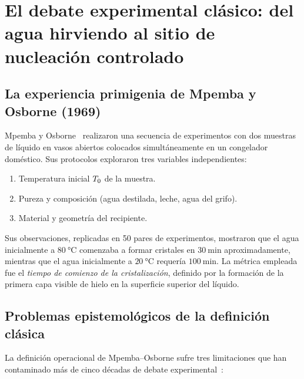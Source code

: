 \chapter{El debate experimental clásico: del agua hirviendo al sitio de nucleación controlado}
\label{ch:debate_clasico}

\section{La experiencia primigenia de Mpemba y Osborne (1969)}

Mpemba y Osborne~\cite{mpemba1969} realizaron una secuencia de experimentos con dos 
muestras de líquido en vasos abiertos colocados simultáneamente en un congelador 
doméstico. Sus protocolos exploraron tres variables independientes:
\begin{enumerate}
\item Temperatura inicial $T_{0}$ de la muestra.
\item Pureza y composición (agua destilada, leche, agua del grifo).
\item Material y geometría del recipiente.
\end{enumerate}

\noindent Sus observaciones, replicadas en \SI{50}{} pares de experimentos, mostraron 
que el agua inicialmente a $\SI{80}{\celsius}$ comenzaba a formar cristales en 
$\SI{30}{\minute}$ aproximadamente, mientras que el agua inicialmente a 
$\SI{20}{\celsius}$ requería $\SI{100}{\minute}$. La métrica empleada fue el 
\emph{tiempo de comienzo de la cristalización}, definido por la formación de la 
primera capa visible de hielo en la superficie superior del líquido.

\section{Problemas epistemológicos de la definición clásica}

La definición operacional de Mpemba--Osborne sufre tres limitaciones que han 
contaminado más de cinco décadas de debate experimental~\cite{burridge2016}:

